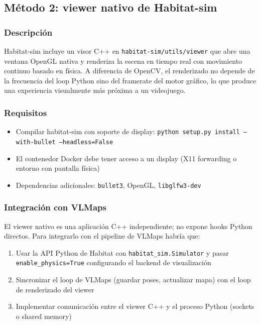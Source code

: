 \documentclass[11pt,a4paper]{article}
\begin{document}
\subsection{Método 2: viewer nativo de Habitat-sim}

\subsubsection*{Descripción}

Habitat-sim incluye un visor C++ en \texttt{habitat-sim/utils/viewer} que abre una ventana OpenGL nativa y renderiza la escena en tiempo real con movimiento continuo basado en física. A diferencia de OpenCV, el renderizado no depende de la frecuencia del loop Python sino del framerate del motor gráfico, lo que produce una experiencia visualmente más próxima a un videojuego.

\subsubsection*{Requisitos}

\begin{itemize}
    \item Compilar habitat-sim con soporte de display: \texttt{python setup.py install --with-bullet --headless=False}
    \item El contenedor Docker debe tener acceso a un display (X11 forwarding o entorno con pantalla física)
    \item Dependencias adicionales: \texttt{bullet3}, OpenGL, \texttt{libglfw3-dev}
\end{itemize}

\subsubsection*{Integración con VLMaps}

El viewer nativo es una aplicación C++ independiente; no expone hooks Python directos. Para integrarlo con el pipeline de VLMaps habría que:
\begin{enumerate}
    \item Usar la API Python de Habitat con \texttt{habitat\_sim.Simulator} y pasar \texttt{enable\_physics=True} configurando el backend de visualización
    \item Sincronizar el loop de VLMaps (guardar poses, actualizar mapa) con el loop de renderizado del viewer
    \item Implementar comunicación entre el viewer C++ y el proceso Python (sockets o shared memory)
\end{enumerate}
\end{document}
